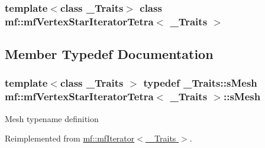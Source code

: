 \subsubsection*{template$<$class \_\-Traits$>$ class mf::mfVertexStarIteratorTetra$<$ \_\-Traits $>$}



\subsection{Member Typedef Documentation}
\hypertarget{classmf_1_1mfVertexStarIteratorTetra_a19a9aafec3afbbafea712fa9c1a3417e}{
\subsubsection[{sMesh}]{\setlength{\rightskip}{0pt plus 5cm}template$<$class \_\-Traits $>$ typedef \_\-Traits::sMesh {\bf mf::mfVertexStarIteratorTetra}$<$ \_\-Traits $>$::{\bf sMesh}}}
\label{classmf_1_1mfVertexStarIteratorTetra_a19a9aafec3afbbafea712fa9c1a3417e}
Mesh typename definition 

Reimplemented from \hyperlink{classmf_1_1mfIterator_aca31e4d7e7eca4e3b100530d8725064b}{mf::mfIterator$<$ \_\-Traits $>$}.



